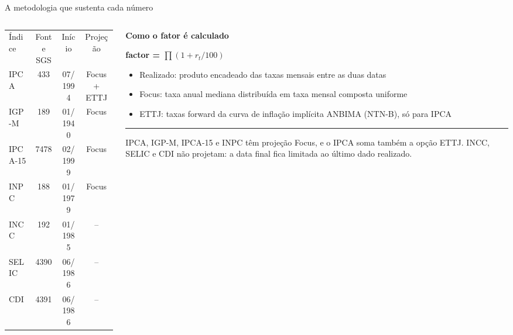 \begin{frame}{A metodologia que sustenta cada número}
  \vspace{4mm}
  \begin{columns}[T, onlytextwidth]
    \begin{column}{0.58\textwidth}
      \begin{tabular}{lccc}
        \rowcolor{amNavy}\color{white}Índice & \color{white}Fonte SGS & \color{white}Início & \color{white}Projeção \\
        \rowcolor{amTableStripe}IPCA & 433 & 07/1994 & Focus + ETTJ \\
        IGP-M & 189 & 01/1940 & Focus \\
        \rowcolor{amTableStripe}IPCA-15 & 7478 & 02/1999 & Focus \\
        INPC & 188 & 01/1979 & Focus \\
        \rowcolor{amTableStripe}INCC & 192 & 01/1985 & -- \\
        SELIC & 4390 & 06/1986 & -- \\
        \rowcolor{amTableStripe}CDI & 4391 & 06/1986 & -- \\
      \end{tabular}
    \end{column}
    \begin{column}{0.38\textwidth}
      {\bfseries Como o fator é calculado}\par\vspace{1.5mm}
      {\bfseries\color{amSignal}factor = \(\prod (1+r_t/100)\)}\par\vspace{1.5mm}
      \begin{itemize}
        \item Realizado: produto encadeado das taxas mensais entre as duas datas
        \item Focus: taxa anual mediana distribuída em taxa mensal composta uniforme
        \item ETTJ: taxas forward da curva de inflação implícita ANBIMA (NTN-B), só para IPCA
      \end{itemize}
      \vspace{4mm}\textcolor{amMist}{\rule{0.92\linewidth}{0.3pt}}\vspace{3mm}
      {\amcondlightfont\color{amGray}IPCA, IGP-M, IPCA-15 e INPC têm projeção Focus, e o IPCA soma também a opção ETTJ. INCC, SELIC e CDI não projetam: a data final fica limitada ao último dado realizado.}
    \end{column}
  \end{columns}
\end{frame}